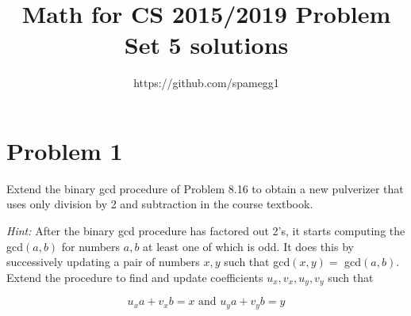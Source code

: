 \documentclass[14pt]{extarticle}
\title{Math for CS 2015/2019 Problem Set 5 solutions}
\author{https://github.com/spamegg1}
\begin{document}
\maketitle
\tableofcontents

\section{Problem 1}
Extend the binary gcd procedure of Problem 8.16 to obtain a new pulverizer that uses only division by 2 and subtraction in the course textbook.

\textit{Hint:} After the binary gcd procedure has factored out 2’s, it starts computing the gcd$(a, b)$ for numbers $a, b$ at least one of which is odd. It does this by successively updating a pair of numbers $x, y$ such that gcd$(x, y) = $ gcd$(a, b)$. Extend the procedure to find and update coefficients $u_x, v_x, u_y, v_y$ such that

$$
u_x a + v_x b = x \text{ and } u_y a + v_y b = y
$$
\end{document}

